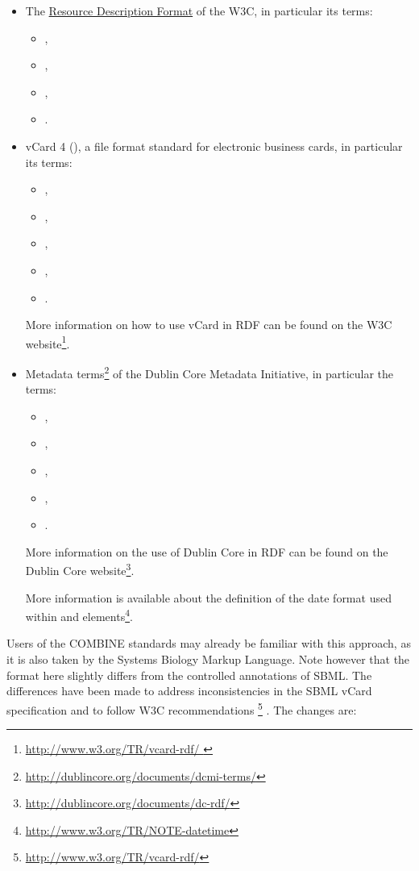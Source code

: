 \begin{itemize}
	\item  {
	
     The \href{http://www.w3.org/RDF/ }{ Resource Description Format} of the 
     W3C, in particular its terms:
     \begin{itemize}
		\item {}, 
		\item {}, 
		\item {}, 
		\item {}.
	\end{itemize}
	}
	\item  {

	vCard 4 (\cite{rfc6350}), a file format standard for electronic business 
    cards, in particular its terms:
    	\begin{itemize}
		\item {}, 
		\item {}, 
		\item {}, 
		\item {},
		\item {}.
	\end{itemize}

	More information on how to use vCard in RDF can be found 
    on the W3C website\footnote[1]{\url{http://www.w3.org/TR/vcard-rdf/ }}.
	
	}
	\item {
	
	Metadata terms\footnote[2]{\url{http://dublincore.org/documents/dcmi-terms/}} of 
	the Dublin Core Metadata Initiative, in particular the terms: 

	\begin{itemize}
		\item {}, 
		\item {}, 
		\item {}, 
		\item {},
		\item {}.
	\end{itemize}
		
	More information on the use of Dublin Core in RDF can be found 
	on the Dublin Core website{\footnote[3]{\url{http://dublincore.org/documents/dc-rdf/}}}. } 
	
	More information is available about the definition of the date format used within  and 
	 elements{\footnote[4]{\url{http://www.w3.org/TR/NOTE-datetime}}}.

\end{itemize}
\pagebreak
Users of the COMBINE standards may already be familiar with this 
approach, as it is also taken by the Systems Biology Markup Language. 
Note however that the format here slightly differs from the controlled 
annotations of SBML. The differences have been made to address inconsistencies 
in the SBML vCard specification and to follow W3C recommendations {\footnote[4]{\url{http://www.w3.org/TR/vcard-rdf/}}} . The changes 
are:

